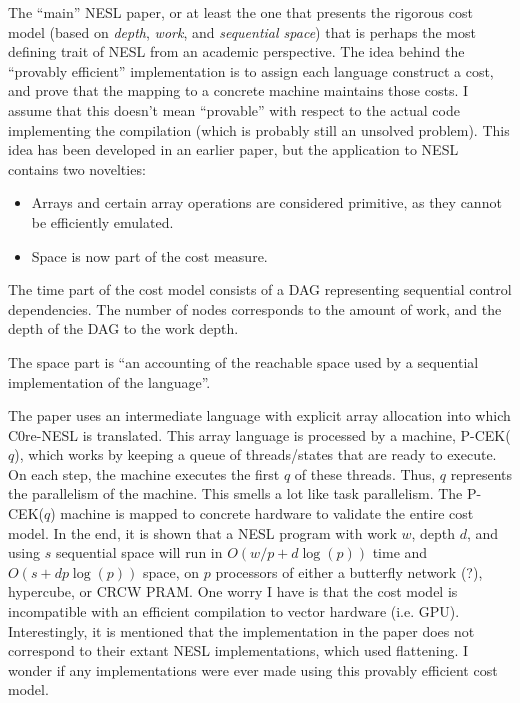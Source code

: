 \documentclass[a4paper, oneside, final]{memoir}
\begin{document}
The ``main'' NESL paper, or at least the one that presents the
rigorous cost model (based on \textit{depth}, \textit{work}, and
\textit{sequential space}) that is perhaps the most defining trait of
NESL from an academic perspective.  The idea behind the ``provably
efficient'' implementation is to assign each language construct a
cost, and prove that the mapping to a concrete machine maintains those
costs.  I assume that this doesn't mean ``provable'' with respect to
the actual code implementing the compilation (which is probably still
an unsolved problem).  This idea has been developed in an earlier
paper, but the application to NESL contains two novelties:

\begin{itemize}
\item Arrays and certain array operations are considered primitive, as
  they cannot be efficiently emulated.
\item Space is now part of the cost measure.
\end{itemize}

The time part of the cost model consists of a DAG representing
sequential control dependencies.  The number of nodes corresponds to
the amount of work, and the depth of the DAG to the work depth.

The space part is ``an accounting of the reachable space used by a
sequential implementation of the language''.

The paper uses an intermediate language with explicit array allocation
into which C0re-NESL is translated.  This array language is processed
by a machine, P-CEK($q$), which works by keeping a queue of
threads/states that are ready to execute.  On each step, the machine
executes the first $q$ of these threads.  Thus, $q$ represents the
parallelism of the machine.  This smells a lot like task parallelism.
The P-CEK($q$) machine is mapped to concrete hardware to validate the
entire cost model.  In the end, it is shown that a NESL program with
work $w$, depth $d$, and using $s$ sequential space will run in $O(w/p
+ d \log(p))$ time and $O(s + d p \log(p))$ space, on $p$ processors
of either a butterfly network (?), hypercube, or CRCW PRAM.  One worry
I have is that the cost model is incompatible with an efficient
compilation to vector hardware (i.e. GPU).  Interestingly, it is
mentioned that the implementation in the paper does not correspond to
their extant NESL implementations, which used flattening.  I wonder if
any implementations were ever made using this provably efficient cost
model.
\end{document}

